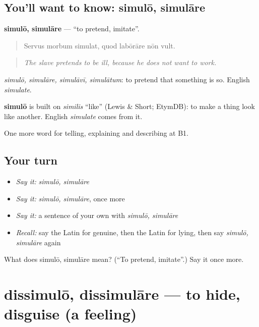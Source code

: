 \subsection*{You'll want to know: simulō, simulāre}
\textbf{simulō, simulāre} — \textquotedblleft{}to pretend, imitate\textquotedblright{}.

\begin{quote}
Servus morbum simulat, quod labōrāre nōn vult.
\end{quote}

\begin{quote}
\emph{The slave pretends to be ill, because he does not want to work.}
\end{quote}

\emph{simulō, simulāre, simulāvī, simulātum}: to pretend that something is so. English \emph{simulate}.

\begin{cousinweb}
\textbf{simulō} is built on \emph{similis} \textquotedblleft{}like\textquotedblright{} (Lewis \& Short; EtymDB): to make a thing look like another. English \emph{simulate} comes from it.
\end{cousinweb}

\begin{grammarlens}[title={What you've built}]
One more word for telling, explaining and describing at B1.
\end{grammarlens}

\subsection*{Your turn}
\begin{itemize}
\raggedright
  \item \emph{Say it:} \emph{simulō, simulāre}
  \item \emph{Say it:} \emph{simulō, simulāre}, once more
  \item \emph{Say it:} a sentence of your own with \emph{simulō, simulāre}
  \item \emph{Recall:} say the Latin for genuine, then the Latin for lying, then say \emph{simulō, simulāre} again
\end{itemize}

\begin{tcolorbox}[breakable,colback=teal!4,colframe=teal!35!black,title={Before you move on}]
What does simulō, simulāre mean? (\textquotedblleft{}To pretend, imitate\textquotedblright{}.) Say it once more.
\end{tcolorbox}
\section[dissimulō, dissimulāre]{dissimulō, dissimulāre — to hide, disguise (a feeling)}

